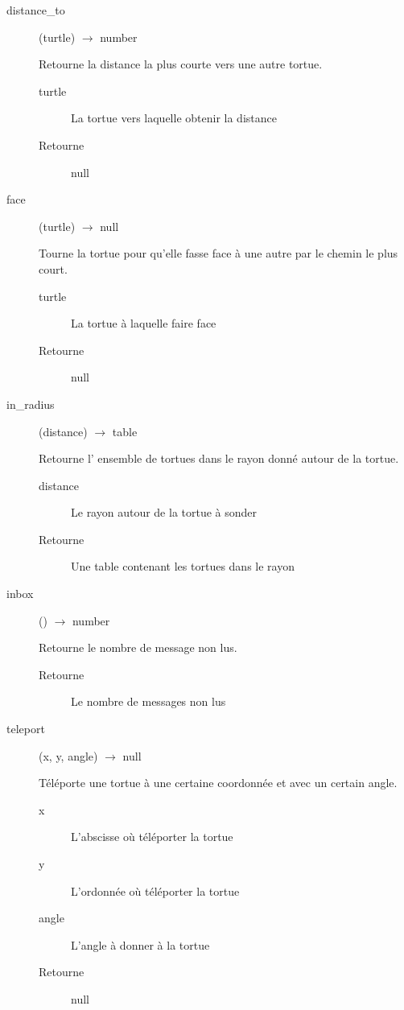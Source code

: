 \begin{description}
	\item[distance\_to] (turtle) $\rightarrow$ number

	Retourne la distance la plus courte vers une autre tortue.

	\begin{description}
		\item[turtle] La tortue vers laquelle obtenir la distance
		\item[Retourne] null
	\end{description}

	\item[face] (turtle) $\rightarrow$ null

	Tourne la tortue pour qu'elle fasse face à une autre par le chemin le plus court.

	\begin{description}
		\item[turtle] La tortue à laquelle faire face
		\item[Retourne] null
	\end{description}

	\item[in\_radius] (distance) $\rightarrow$ table

	Retourne l' ensemble de tortues dans le rayon donné autour de la tortue.

	\begin{description}
		\item[distance] Le rayon autour de la tortue à sonder
		\item[Retourne] Une table contenant les tortues dans le rayon
	\end{description}

	\item[inbox] () $\rightarrow$ number

	Retourne le nombre de message non lus.

	\begin{description}
		\item[Retourne] Le nombre de messages non lus
	\end{description}

	\item[teleport] (x, y, angle) $\rightarrow$ null

	Téléporte une tortue à une certaine coordonnée et avec un certain angle.

	\begin{description}
		\item[x] L'abscisse où téléporter la tortue
		\item[y] L'ordonnée où téléporter la tortue
		\item[angle] L'angle à donner à la tortue
		\item[Retourne] null
	\end{description}
\end{description}

